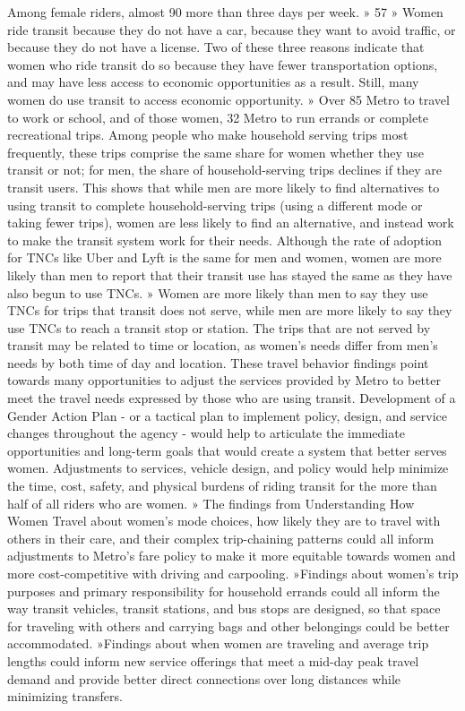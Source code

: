 \documentclass[
  12pt,
]{article}
\begin{document}
\begin{flushleft}
\begin{flushleft}
Among female riders, almost 90%
more than three days per week.
» 57%
» Women ride transit because they do not have a
car, because they want to avoid traffic, or because
they do not have a license. Two of these three
reasons indicate that women who ride transit
do so because they have fewer
transportation options, and may
have less access to economic
opportunities as a result.
Still, many women do use transit
to access economic opportunity.
» Over 85%
Metro to travel to work or school,
and of those women, 32%
Metro to run errands or complete
recreational trips.
Among people who make household
serving trips most frequently,
these trips comprise the same
share for women whether they use
transit or not; for men, the share of
household-serving trips declines if
they are transit users. This shows
that while men are more likely to
find alternatives to using transit to
complete household-serving trips
(using a different mode or taking
fewer trips), women are less likely
to find an alternative, and instead
work to make the transit system work for their needs.
Although the rate of adoption for TNCs like Uber and
Lyft is the same for men and women, women are more
likely than men to report that their transit use has
stayed the same as they have also begun to use TNCs.
» Women are more likely than men to say they use
TNCs for trips that transit does not serve, while
men are more likely to say they use TNCs to reach a
transit stop or station. The trips that are not served
by transit may be related to time or location, as
women’s needs differ from men’s needs by both
time of day and location.
These travel behavior findings point towards many
opportunities to adjust the services provided by Metro
to better meet the travel needs expressed by those
who are using transit. Development of a Gender Action
Plan - or a tactical plan to implement policy, design,
and service changes throughout the agency - would
help to articulate the immediate opportunities and
long-term goals that would create a system that
better serves women. Adjustments to services, vehicle
design, and policy would help minimize the time,
cost, safety, and physical burdens of riding transit
for the more than half of all riders who are women.
» The findings from Understanding
How Women Travel about women’s
mode choices, how likely they are to
travel with others in their care, and
their complex trip-chaining patterns
could all inform adjustments to
Metro’s fare policy to make it more
equitable towards women and more
cost-competitive with driving and
carpooling.
»Findings about women’s trip
purposes and primary responsibility
for household errands could all
inform the way transit vehicles,
transit stations, and bus stops are
designed, so that space for traveling
with others and carrying bags and
other belongings could be better
accommodated.
»Findings about when women are
traveling and average trip lengths
could inform new service offerings
that meet a mid-day peak travel
demand and provide better direct
connections over long distances while
minimizing transfers. 



\end{flushleft}
\end{flushleft}
\end{document}
